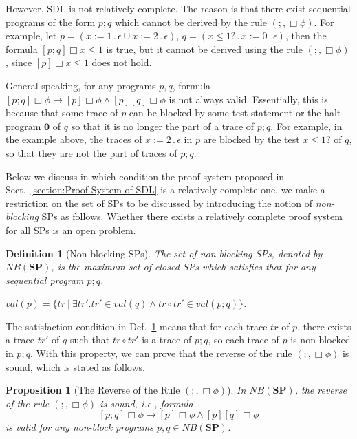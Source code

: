 \documentclass{fcs}
\newtheorem{mydef}{Definition}[section]
\newtheorem{prop}{Proposition}[section]
\newcommand{\halt}[0]{\mathbf{0}}
\newcommand{\SP}[0]{\mathbf{SP}}
\newcommand{\val}[0]{\mathit{val}}
\DeclareMathOperator{\seq}{;}
\DeclareMathOperator{\nex}{.}
\newcommand{\NB}[0]{\mathit{NB}}
\begin{document}
However, SDL is not relatively complete.
The reason is that there exist sequential programs of the form $p\seq q$ which cannot be derived by the rule $(\seq, \Box\phi)$.
For example, let $p = (x := 1\nex \epsilon\cup x:=2\nex \epsilon)$, $q = (x\le 1?\nex x:=0\nex\epsilon)$, then the formula $[p\seq q]\Box x\le 1$ is true, but it cannot be derived using the rule $(\seq, \Box\phi)$, since
$[p]\Box x\le 1$ does not hold.

General speaking, for any programs $p, q$, formula $[p\seq q]\Box\phi\to [p]\Box\phi\wedge [p][q]\Box\phi$ is not always valid.
Essentially, this is because that some trace of $p$ can be blocked by some test statement or the halt program $\halt$ of $q$ so that it is no longer the part of a trace of $p\seq q$.
For example, in the example above, the traces of $x:=2\nex \epsilon$ in $p$ are blocked by the test $x\le 1?$ of $q$, so that they are not the part of traces of $p\seq q$.

Below we discuss in which condition the proof system proposed in Sect.~\ref{section:Proof System of SDL} is a relatively complete one.
we make a restriction on the set of SPs to be discussed by introducing the notion of \emph{non-blocking} SPs as follows.
Whether there exists a relatively complete proof system for all SPs is an open problem.


\begin{mydef}[Non-blocking SPs]
\label{def:Non-blocking SPs}
    The set of non-blocking SPs, denoted by $\NB(\SP)$,  is the maximum set of closed SPs which satisfies that for any sequential program $p\seq q$,
    \begin{center}
    $\val(p)= \{tr\ |\ \exists tr'. tr'\in \val(q)\wedge tr\circ tr'\in \val(p\seq q)\}$.
    \end{center}
\end{mydef}

The satisfaction condition in Def.~\ref{def:Non-blocking SPs} means that for each trace $tr$ of $p$, there exists a trace $tr'$ of $q$ such that $tr\circ tr'$ is a trace of $p\seq q$, so
each trace of $p$ is non-blocked in $p\seq q$.
With this property, we can prove that the reverse of the rule $(\seq, \Box\phi)$ is sound, which is stated as follows.

\begin{prop}[The Reverse of the Rule $(\seq, \Box\phi)$]
\label{prop:The Reverse of the Rule (seq,Boxphi)}
    In $\NB(\SP)$, the reverse of the rule $(\seq, \Box\phi)$ is sound, i.e.,
    formula
    $$[p\seq q]\Box\phi \to [p]\Box\phi\wedge [p][q]\Box\phi$$
    is valid for any non-block programs $p, q\in \NB(\SP)$.
\end{prop}
\end{document}
